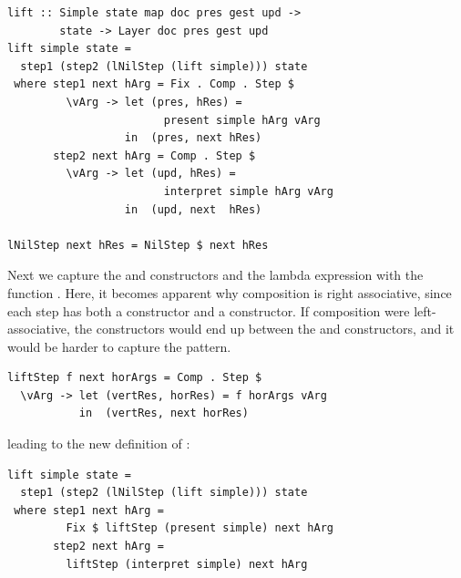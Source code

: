 \documentclass[preprint,natbib]{sigplanconf}
\begin{document}
      
      
\begin{small} %
\begin{verbatim}
lift :: Simple state map doc pres gest upd -> 
        state -> Layer doc pres gest upd
lift simple state =  
  step1 (step2 (lNilStep (lift simple))) state
 where step1 next hArg = Fix . Comp . Step $
         \vArg -> let (pres, hRes) = 
                        present simple hArg vArg
                  in  (pres, next hRes)
       step2 next hArg = Comp . Step $
         \vArg -> let (upd, hRes) = 
                        interpret simple hArg vArg
                  in  (upd, next  hRes)

lNilStep next hRes = NilStep $ next hRes
\end{verbatim}%
\end{small}

Next we  capture the  and  constructors and the lambda expression with the function . Here, it becomes apparent why composition is right associative, since each step has both a constructor and a  constructor. If composition were left-associative, the  constructors would end up between the  and  constructors, and it would be harder to capture the pattern.

\begin{small} %
\begin{verbatim}
liftStep f next horArgs = Comp . Step $ 
  \vArg -> let (vertRes, horRes) = f horArgs vArg
           in  (vertRes, next horRes)
\end{verbatim}%
\end{small}

\noindent leading to the new definition of :

\begin{small} %
\begin{verbatim}
lift simple state =
  step1 (step2 (lNilStep (lift simple))) state
 where step1 next hArg = 
         Fix $ liftStep (present simple) next hArg
       step2 next hArg =
         liftStep (interpret simple) next hArg 
\end{verbatim}%
\end{small}
\end{document}
